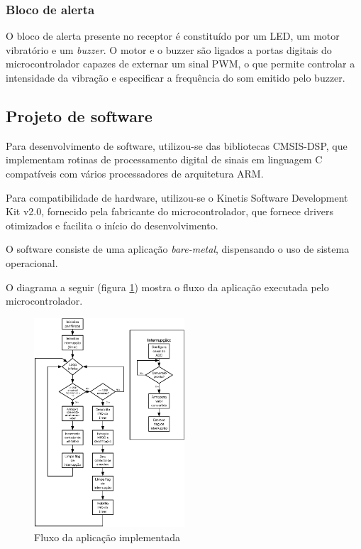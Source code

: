 \documentclass[10pt,a4paper]{article}
\begin{document}
\begin{multicols*}{2}
\subsubsection{Bloco de alerta}
O bloco de alerta presente no receptor é constituído por um LED, um motor vibratório e um \textit{buzzer}.
O motor e o buzzer são ligados a portas digitais do microcontrolador capazes de externar um sinal PWM, o que permite controlar a intensidade da vibração e especificar a frequência do som emitido pelo buzzer.

\subsection{Projeto de software}
Para desenvolvimento de software, utilizou-se das bibliotecas CMSIS-DSP, que implementam rotinas de processamento digital de sinais em linguagem C compatíveis com vários processadores de arquitetura ARM.

Para compatibilidade de hardware, utilizou-se o Kinetis Software Development Kit v2.0, fornecido pela fabricante do microcontrolador, que fornece drivers otimizados e facilita o início do desenvolvimento.

O software consiste de uma aplicação \textit{bare-metal}, dispensando o uso de sistema operacional.

O diagrama a seguir (figura \ref{fig:fluxoaplicacao}) mostra o fluxo da aplicação executada pelo microcontrolador.
	
\begin{figure}[H]
	\centering
	\includegraphics[width=0.5\textwidth]{../Diagramas/FluxoAplicacao}
	\caption{Fluxo da aplicação implementada}
	\label{fig:fluxoaplicacao}
\end{figure}


\end{multicols*}
\end{document}
